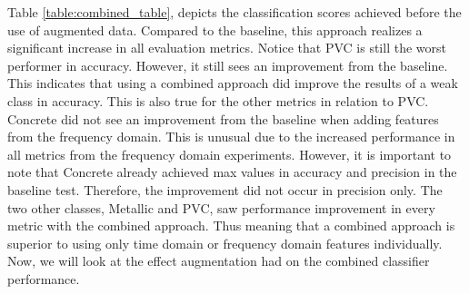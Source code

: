 \hspace{0.5in}Table \ref{table:combined_table}, depicts the classification scores achieved before the use of augmented data. Compared to the baseline, this approach realizes a significant increase in all evaluation metrics. Notice that PVC is still the worst performer in accuracy. However, it still sees an improvement from the baseline. This indicates that using a combined approach did improve the results of a weak class in accuracy. This is also true for the other metrics in relation to PVC. Concrete did not see an improvement from the baseline when adding features from the frequency domain. This is unusual due to the increased performance in all metrics from the frequency domain experiments. However, it is important to note that Concrete already achieved max values in accuracy and precision in the baseline test. Therefore, the improvement did not occur in precision only. The two other classes, Metallic and PVC, saw performance improvement in every metric with the combined approach. Thus meaning that a combined approach is superior to using only time domain or frequency domain features individually. Now, we will look at the effect augmentation had on the combined classifier performance.  
\vspace{0.5\baselineskip}

